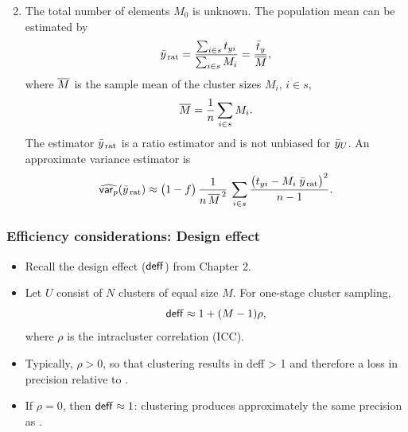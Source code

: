 \documentclass{my_eth_beamer}
\numberwithin{equation}{section}
\begin{document}
\begin{frame}
    \begin{enumerate}[1)]
    \setcounter{enumi}{1}
    \setlength{\itemsep}{8pt}
        \item The total number of elements $M_0$ is \alert{unknown}. The
            population mean can be estimated by
            \begin{equation*}
                \bar{y}_{\,\mathrm{rat}} = \frac{\sum_{i \in s} t_{yi}}
                    {\sum_{i \in s} M_i} = \frac{\bar{t}_y}{\overline{M}},
            \end{equation*}
            where $\overline{M}$ is the sample mean of the cluster sizes $M_i$,
            $i\in s$,
            \begin{equation*}
                \overline{M} = \frac{1}{n}\sum_{i \in s} M_i.
            \end{equation*}
            The estimator $\bar{y}_{\,\mathrm{rat}}$ is a \alert{ratio estimator}
            and is \alert{not unbiased} for $\bar{y}_U$. An approximate
            \alert{variance estimator} is
            \begin{equation*}
                \widehat{\mathsf{var}_p}(\bar{y}_{\,\mathrm{rat}}) \approx \big(1-f\big) \,
                \frac{1}{n \, \overline{M}^{\,2}} \, \sum_{i \in s}
                \frac{\big(t_{yi} - M_i \; \bar{y}_{\,\mathrm{rat}}\big)^2}
                    {n - 1}.
            \end{equation*}
    \end{enumerate}
\end{frame}

\begin{frame}
    \frametitle{\normalsize{Efficiency considerations: Design effect}}
    \begin{itemize}
    \setlength{\itemsep}{12pt}
        \item Recall the \alert{design effect} ($\mathsf{deff}$) from Chapter 2.
        \item Let $U$ consist of $N$ clusters of \alert{equal size} $M$. For
            one-stage cluster sampling,
            \begin{equation*}
                \mathsf{deff} \approx 1+(M-1)\rho,
            \end{equation*}
            where $\rho$ is the \alert{intracluster correlation} (ICC).
        \item Typically, $\rho>0$, so that clustering results in
            \alert{deff > 1} and therefore a loss in precision relative to
            \SRS.
        \item If $\rho=0$, then $\mathsf{deff}\approx1$: clustering produces
            approximately the same precision as \SRS.
    \end{itemize}
\end{frame}
\end{document}
